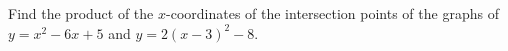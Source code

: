 Find the product of the $x$-coordinates of the intersection points of the graphs of $y=x^2-6x+5$ and $y=2(x-3)^2-8$.
